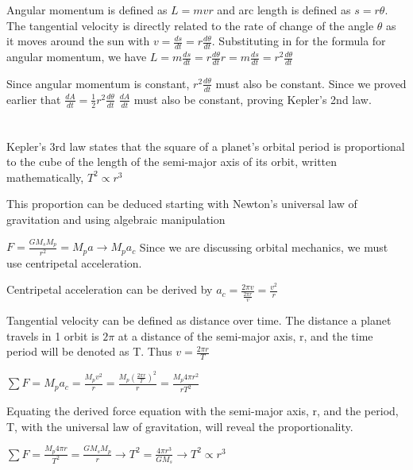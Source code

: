 \documentclass{article}
\begin{document}
Angular momentum is defined as $L = m v r$ and arc length is defined as $s = r \theta$. The tangential velocity is directly related to the rate of change of the angle $\theta$ as it moves around the sun with $v = \frac{ds}{dt} = r \frac{d\theta}{dt}$. Substituting in for the formula for angular momentum, we have $L = m \frac{ds}{dt} = r \frac{d\theta}{dt} r = m \frac{ds}{dt} = r^2 \frac{d\theta}{dt}$ \newline

Since angular momentum is constant, $r^2 \frac{d\theta}{dt}$ must also be constant. Since we proved earlier that $\frac{dA}{dt} = \frac{1}{2} r^2 \frac{d\theta}{dt}$ $\frac{dA}{dt}$ must also be constant, proving Kepler's 2nd law.


\section*{}

Kepler's 3rd law states that the square of a planet's orbital period is proportional to the cube of the length of the semi-major axis of its orbit, written mathematically, $T^2 \propto r^3$ \newline

This proportion can be deduced starting with Newton's universal law of gravitation and using algebraic manipulation \newline

$F = \frac{GM_sM_p}{r^2} = M_pa \rightarrow M_pa_c$ Since we are discussing orbital mechanics, we must use centripetal acceleration. \newline

Centripetal acceleration can be derived by $a_c = \frac{2\pi v}{\frac{2 \pi r}{v}} = \frac{v^2}{r}$ \newline

\begin{center}
\end{center}

Tangential velocity can be defined as distance over time. The distance a planet travels in 1 orbit is $2\pi$ at a distance of the semi-major axis, r, and the time period will be denoted as T. Thus $v = \frac{2\pi r}{T}$ \newline

$\sum F = M_p a_c = \frac{M_p v^2}{r} = \frac{M_p ({\frac{2 \pi r}{T}})^2}{r} = \frac{M_p 4 \pi r^2}{r T^2}$ \newline

Equating the derived force equation with the semi-major axis, r, and the period, T, with the universal law of gravitation, will reveal the proportionality. \newline

$\sum F = \frac{M_p 4 \pi r}{T^2} = \frac{GM_sM_p}{r}\rightarrow T^2 = \frac{4 \pi r^3}{G M_s} \rightarrow T^2 \propto r^3$
\end{document}
